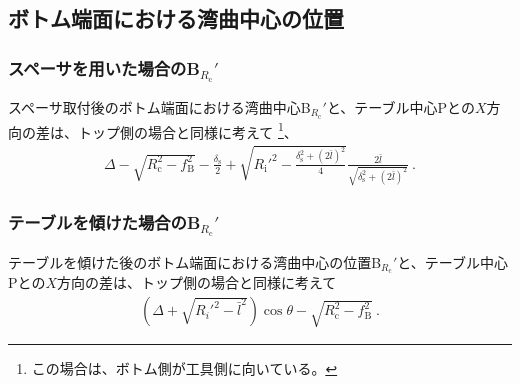 \clearpage


\subsection{ボトム端面における湾曲中心の位置}

\subsubsection{スペーサを用いた場合のB\texorpdfstring{$_{R_\mathrm c}'$}{Rc'}}
スペーサ取付後のボトム端面における湾曲中心B$_{R_\mathrm c}'$と、テーブル中心Pとの$X$方向の差は、トップ側の場合と同様に考えて
\footnote{この場合は、ボトム側が工具側に向いている。}、
\begin{align*}
  \Delta-\sqrt{R_\mathrm c^2-f_\mathrm B^2}-\frac{\delta_\mathrm s}2
  +\sqrt{R_\mathrm i'^2-\frac{\delta_\mathrm s^2+(2\bar l)^2}4}\frac{2\bar l}{\sqrt{\delta_\mathrm s^2+(2\bar l)^2}}\ .
\end{align*}


\subsubsection{テーブルを傾けた場合のB\texorpdfstring{$_{R_\mathrm c}'$}{Rc'}}
テーブルを傾けた後のボトム端面における湾曲中心の位置B$_{R_\mathrm c}'$と、テーブル中心Pとの$X$方向の差は、トップ側の場合と同様に考えて
\begin{align}
  \label{eq:tableBRc}
  \left(\Delta+\sqrt{R_i'^2-\bar l^2}\right)\cos\theta-\sqrt{R_\mathrm c^2-f_\mathrm B^2}~.
\end{align}



